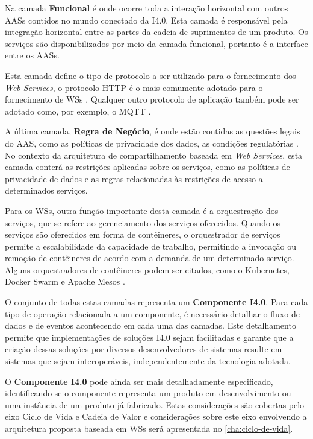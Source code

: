	Na camada \textbf{Funcional} é onde ocorre toda a interação horizontal com outros AASs contidos no mundo conectado da I4.0. Esta camada é responsável pela integração horizontal entre as partes da cadeia de suprimentos de um produto. Os serviços são disponibilizados por meio da camada funcional, portanto é a interface entre os AASs. 
	
	Esta camada define o tipo de protocolo a ser utilizado para o fornecimento dos \textit{Web Services}, o protocolo HTTP é o mais comumente adotado para o fornecimento de WSs \cite{gruner2016restful}. Qualquer outro protocolo de aplicação também pode ser adotado como, por exemplo, o MQTT \cite{yokotani2016mqtt}.
	
	A última camada, \textbf{Regra de Negócio}, é onde estão contidas as questões legais do AAS, como as políticas de privacidade dos dados, as condições regulatórias \cite{adolphs2015rami}. No contexto da arquitetura de compartilhamento baseada em \textit{Web Services}, esta camada conterá as restrições aplicadas sobre os serviços, como as políticas de privacidade de dados e as regras relacionadas às restrições de acesso a determinados serviços.
	
	Para os WSs, outra função importante desta camada é a orquestração dos serviços, que se refere ao gerenciamento dos serviços oferecidos. Quando os serviços são oferecidos em forma de contêineres, o orquestrador de serviços permite a escalabilidade da capacidade de trabalho, permitindo a invocação ou remoção de contêineres de acordo com a demanda de um determinado serviço. Alguns orquestradores de contêineres podem ser citados, como o Kubernetes, Docker Swarm e Apache Mesos \cite{redhat2020orchestration}.
	
	O conjunto de todas estas camadas representa um \textbf{Componente I4.0}. Para cada tipo de operação relacionada a um componente, é necessário detalhar o fluxo de dados e de eventos acontecendo em cada uma das camadas. Este detalhamento permite que implementações de soluções I4.0 sejam facilitadas e garante que a criação dessas soluções por diversos desenvolvedores de sistemas resulte em sistemas que sejam interoperáveis, independentemente da tecnologia adotada.
	
	O \textbf{Componente I4.0} pode ainda ser mais detalhadamente especificado, identificando se o componente representa um produto em desenvolvimento ou uma instância de um produto já fabricado. Estas considerações são cobertas pelo eixo Ciclo de Vida e Cadeia de Valor e considerações sobre este eixo envolvendo a arquitetura proposta baseada em WSs será apresentada no \autoref{cha:ciclo-de-vida}.
	
